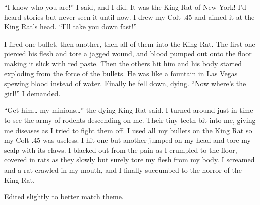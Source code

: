 ``I know who you are!'' I said, and I did. It was the King Rat of New
York! I'd heard stories but never seen it until now. I drew my Colt
.45 and aimed it at the King Rat's head. ``I'll take you down
fast!''



I fired one bullet, then another, then all of them into the King
Rat. The first one pierced his flesh and tore a jagged wound, and
blood pumped out onto the floor making it slick with red paste.
Then the others hit him and his body started exploding from the
force of the bullets. He was like a fountain in Las Vegas spewing
blood instead of water. Finally he fell down, dying. ``Now where's
the girl!'' I demanded.



``Get him{\ldots} my minions{\ldots}'' the dying King Rat said. I turned around
just in time to see the army of rodents descending on me. Their
tiny teeth bit into me, giving me diseases as I tried to fight them
off. I used all my bullets on the King Rat so my Colt .45 was
useless. I hit one but another jumped on my head and tore my scalp
with its claws. I blacked out from the pain as I crumpled to the
floor, covered in rats as they slowly but surely tore my flesh from
my body. I screamed and a rat crawled in my mouth, and I finally
succumbed to the horror of the King Rat.







Edited slightly to better match theme. 

 



